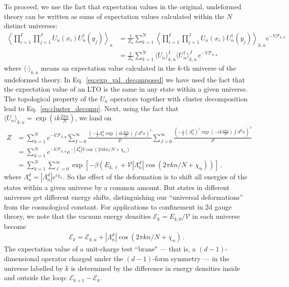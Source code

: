 \documentclass[11pt]{article}
\def\coeff#1#2{{\textstyle {\frac {#1}{#2}}}}
\def\half{\coeff 12}
\def\mn#1{\todo[size=small]{\textcolor{magenta}{{\bf MN}: #1}}}
\def\ac#1{\todo[size=small]{\textcolor{teal}{{\bf AC}: #1}}}
\begin{document}
To proceed, we use the fact that expectation values in the original, undeformed
theory can be written as sums of expectation values calculated within the $N$
distinct universes:
\begin{align}
    \left\langle \prod_{i=1}^I\prod_{j=1}^J U_n(x_i) U_n^\dagger(y_j)\right\rangle_u 
    &= \frac{1}{Z_{u}}\sum_{k = 1}^{N} \left\langle 
    \prod_{i=1}^I\prod_{j=1}^J U_n(x_i) U_n^\dagger(y_j)\right\rangle_{k,u}
     e^{- V \mathcal{F}_{k,u}} \label{eq:exp_val_decomposed}\\
     &=\frac{1}{Z_{u}}\sum_{k = 1}^{N}
      \langle U_{n} \rangle_{k,u}^{I} \langle U_{n}^{\dag} \rangle_{k,u}^{J} 
      \,e^{- V \mathcal{F}_{k,u}}\label{eq:cluster_decomp} 
\end{align}
where $\langle \cdot \rangle_{k,u}$ means an expectation value calculated in the
$k$-th universe of the undeformed theory. In Eq.~\eqref{eq:exp_val_decomposed}
we have used the fact that the expectation value of an LTO is the same in any
state within a given universe. The topological property of the $U_n$ operators
together with cluster decomposition lead to Eq.~\eqref{eq:cluster_decomp}. Next,
using the fact that $\langle U_n\rangle_{k,u}=\exp{\left(i k \frac{2\pi
n}{N}\right)}$, we land on 
\begin{align}
    Z
       &= \sum_{k = 1}^{N} e^{- V \mathcal{F}_{k,u}} \sum_{I=0}^\infty
     \frac{(-\half \Lambda^d_n \exp{\left(i k \frac{2\pi n}{N}\right)} \int d^{d}x)^{I}}{I!} 
     \sum_{J=0}^\infty
     \frac{(-\half (\Lambda^d_n)^{\dag} \exp{\left(-i k \frac{2\pi n}{N}\right)} \int d^{d}x)^{J}}{J!} \\
     &=  \sum_{k = 1}^{N} e^{- V \mathcal{F }_{k,u}} 
     e^{-|\Lambda^d_n| V \cos{(2\pi  k n/N + \chi_n)}} \\
     &= \sum_{k = 1}^{N} \sum_{\ell=0}^{\infty} 
     \exp\left[-\beta \left(E_{k,\ell} + 
     \mathcal{V}  |\Lambda^d_n| \cos\left(2\pi  k n/N +\chi_n\right)\right) \right]\,.
\end{align}
where $\Lambda^d_n = |\Lambda^{d}_n|e^{i\chi_n}$.
So the effect of the deformation is to shift all energies of the states within a
given universe by a common amount.  But states in different universes get
different energy shifts, distinguishing our ``universal deformations'' from the
cosmological constant.  For applications to confinement in 2d gauge theory, we note that the vacuum
energy densities $\mathcal{E}_{k} = E_{k,0}/\mathcal{V}$ in each universe become
\begin{align}
\mathcal{E}_k = \mathcal{E}_{k,u} +|\Lambda_n^d| \cos{(2\pi  k n/N +\chi_n) }\, .
\end{align}
The expectation value of a unit-charge test ``brane" --- that is, a $(d-1)$-dimensional operator charged under the $(d-1)$-form symmetry --- in the universe labelled by $k$ is determined by the difference in energy densities inside and outside the loop: $\mathcal E_{k+1} - \mathcal E_{k}$. 
\end{document}
